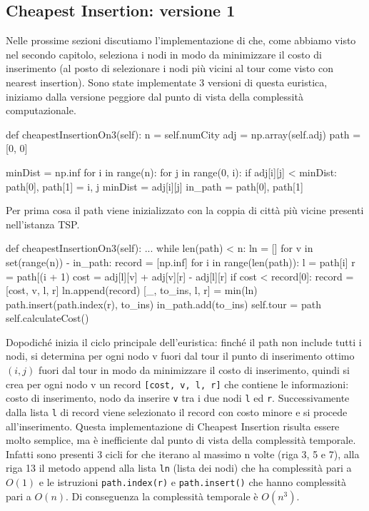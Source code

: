 \documentclass[a4paper,12pt]{report}
\begin{document}
\subsection{Cheapest Insertion: versione 1}
Nelle prossime sezioni discutiamo l'implementazione di  che, come abbiamo visto nel secondo capitolo, seleziona i nodi in modo da minimizzare il costo di inserimento (al posto di selezionare i nodi più vicini al tour come visto con nearest insertion). Sono state implementate 3 versioni di questa euristica, iniziamo dalla versione peggiore dal punto di vista della complessità computazionale.
\begin{python}
def cheapestInsertionOn3(self):
  n = self.numCity
  adj = np.array(self.adj)
  path = [0, 0]

  minDist = np.inf
  for i in range(n):
    for j in range(0, i):
      if adj[i][j] < minDist:
        path[0], path[1] = i, j
        minDist = adj[i][j]
  in_path = {path[0], path[1]}
\end{python}
Per prima cosa il path viene inizializzato con la coppia di città più vicine presenti nell'istanza TSP.
\begin{python}
def cheapestInsertionOn3(self):
  ...
  while len(path) < n:
    ln = []
    for v in set(range(n)) - in_path:
      record = [np.inf]
      for i in range(len(path)):
        l = path[i]
        r = path[(i + 1) %
        cost = adj[l][v] + adj[v][r] - adj[l][r]
        if cost < record[0]:
          record = [cost, v, l, r]
      ln.append(record)
    [_, to_ins, l, r] = min(ln)
    path.insert(path.index(r), to_ins)
    in_path.add(to_ins)                
  self.tour = path
  self.calculateCost()
\end{python}
Dopodiché inizia il ciclo principale dell'euristica: finché il path non include tutti i nodi, si determina per ogni nodo v fuori dal tour il punto di inserimento ottimo $(i, j)$ fuori dal tour in modo da minimizzare il costo di inserimento, quindi si crea per ogni nodo v un record \lstinline![cost, v, l, r]! che contiene le informazioni: costo di inserimento, nodo da inserire \lstinline!v! tra i due nodi \lstinline!l! ed \lstinline!r!. Successivamente dalla lista \lstinline!l! di record viene selezionato il record con costo minore e si procede all'inserimento. \newline
Questa implementazione di Cheapest Insertion risulta essere molto semplice, ma è inefficiente dal punto di vista della complessità temporale. Infatti sono presenti 3 cicli for che iterano al massimo n volte (riga 3, 5 e 7), alla riga 13 il metodo append alla lista \lstinline!ln! (lista dei nodi) che ha complessità pari a $O(1)$ e le istruzioni \lstinline!path.index(r)! e \lstinline!path.insert()! che hanno complessità pari a $O(n)$. Di conseguenza la complessità temporale è $O(n^3)$.\newline
\end{document}

